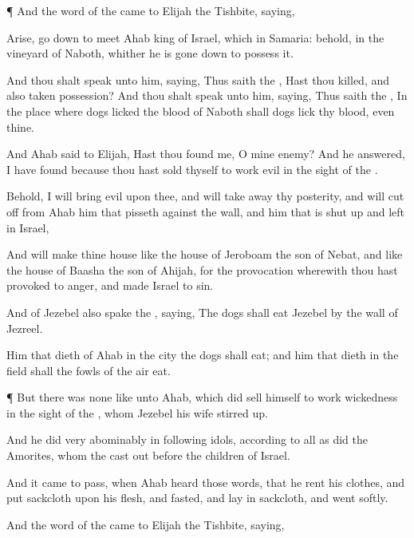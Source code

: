 {\par }{\PP {}¶ And the
word of the
{} came to
Elijah the
Tishbite,
saying,

Arise, go
down to
meet
Ahab
king of
Israel, which
{} in
Samaria: behold,
{} in the
vineyard of
Naboth, whither he is gone
down to
possess it.

And thou shalt
speak unto him,
saying, Thus
saith the
{}, Hast thou
killed, and also taken
possession? And thou shalt
speak unto him,
saying, Thus
saith the
{}, In the
place where
dogs
licked the
blood of
Naboth shall
dogs
lick thy
blood, even thine.

And
Ahab
said to
Elijah, Hast thou
found me, O mine
enemy? And he
answered, I have
found
{} because thou hast
sold thyself to
work
evil in the
sight of the
{}.

Behold, I will
bring
evil upon thee, and will take
away thy
posterity, and will cut
off from
Ahab him that
pisseth against the
wall, and him that is shut
up and
left in
Israel,

And will
make thine
house like the
house of
Jeroboam the
son of
Nebat, and like the
house of
Baasha the
son of
Ahijah, for the
provocation wherewith thou hast provoked
{} to
anger, and made
Israel to
sin.

And of
Jezebel also
spake the
{},
saying, The
dogs shall
eat
Jezebel by the
wall of
Jezreel.

Him that
dieth of
Ahab in the
city the
dogs shall
eat; and him that
dieth in the
field shall the
fowls of the
air
eat.


\par }{\PP {}¶ But there was none like unto
Ahab, which did
sell himself to
work
wickedness in the
sight of the
{}, whom
Jezebel his
wife stirred
up.

And he did
very
abominably in
following
idols, according to all
{} as
did the
Amorites, whom the
{} cast
out
before the
children of
Israel.

And it came to pass, when
Ahab
heard those
words, that he
rent his
clothes, and
put
sackcloth upon his
flesh, and
fasted, and
lay in
sackcloth, and
went
softly.

And the
word of the
{} came to
Elijah the
Tishbite,
saying,

}
